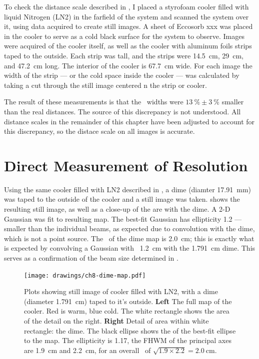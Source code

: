 To check the distance scale described in , I placed a styrofoam cooler filled with liquid Nitrogen (LN2) in the farfield of the system and scanned the system over it, using data acquired to create still images.
A sheet of Eccosorb xxx was placed in the cooler to serve as a cold black surface for the system to observe.
Images were acquired of the cooler itself, as well as the cooler with aluminum foils strips taped to the outside.
Each strip was  tall, and the strips were \SI{14.5}{\cm}, \SI{29}{\cm}, and \SI{47.2}{\cm} long.
The interior of the cooler is \SI{67.7}{\cm} wide.
For each image the \FWHM width of the strip --- or the cold space inside the cooler --- was calculated by taking a cut through the still image centered n the strip or cooler.

The result of these measurements is that the \FWHM\ widths were $\SI{13}{\percent} \pm \SI{3}{\percent}$ smaller than the real distances. The source of this discrepancy is not understood.
All distance scales in the remainder of this chapter have been adjusted to account for this discrepancy, so the distace scale on all images is accurate.




\section{Direct Measurement of Resolution}

Using the same cooler filled with LN2 described in , a dime (diamter \SI{17.91}{\mm}) was taped to the outside of the cooler and a still image was taken.
 shows the resulting still image, as well as a close-up of the are with the dime.
A 2-D Gaussian was fit to resulting map.
The best-fit Gaussian has ellipticity 1.2 --- smaller than the individual beams, as expected due to convolution with the dime, which is not a point source.
The \FWHM\ of the dime map is \SI{2.0}{\cm}; this is exactly what is expected by convolving a Gaussian with \FWHM\ \SI{1.2}{\cm} with the \SI{1.791}{\cm} dime.
This serves as a confirmation of the beam size determined in .

\begin{figure}[th]
\centering
\texttt{[image: drawings/ch8-dime-map.pdf]}
\caption{
  Plots showing still image of cooler filled with LN2, with a dime (diameter \SI{1.791}{\cm}) taped to it's outside.
  \textbf{Left} The full map of the cooler. Red is warm, blue cold. The white rectangle shows the area of the detail on the right.
  \textbf{Right} Detail of area within white rectangle: the dime.
  The black ellipse shows the \FWHM of the best-fit ellipse to the map. The ellipticity is \num{1.17}, the FHWM of the principal axes are \SI{1.9}{\cm} and \SI{2.2}{\cm}, for an overall \FWHM\ of $\sqrt{1.9 \times 2.2} = \SI{2.0}{\cm}$.
}
\label{fig:ch8-dime-map}
\end{figure}

